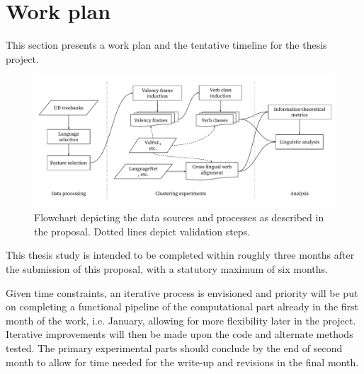 \section{Work plan}\label{sec:plan}

This section presents a work plan and the tentative timeline for the thesis project.

\begin{figure}[t]
    \centering
    \begin{adjustbox}{center,scale=0.65}
    \includegraphics{figures/proposal_flowchart.pdf}
    \end{adjustbox}
    \caption{Flowchart depicting the data sources and processes as described in the proposal. Dotted lines depict validation steps.}\label{fig:flowchart}
\end{figure}


This thesis study is intended to be completed within roughly three months after the submission of this proposal, with a statutory maximum of six months.

Given time constraints, an iterative process is envisioned and priority will be put on completing a functional pipeline of the computational part already in the first month of the work, i.e. January, allowing for more flexibility later in the project. Iterative improvements will then be made upon the code and alternate methods tested. The primary experimental parts should conclude by the end of second month to allow for time needed for the write-up and revisions in the final month. 
